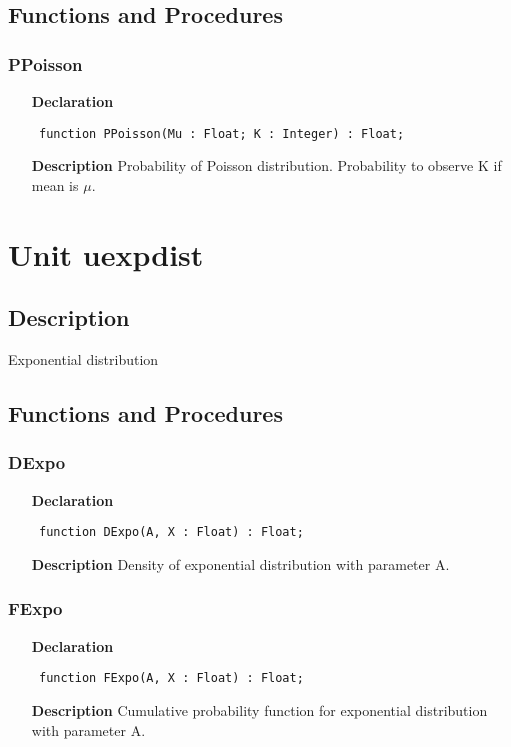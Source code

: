 \documentclass[12pt,a4paper,oneside]{report}
\newcommand{\declarationitem}[1]{\textbf{#1}}
\newcommand{\descriptiontitle}[1]{\textbf{#1}}
\newcommand{\code}[1]{\texttt{#1}}
\begin{document}
\subsection{Functions and Procedures}
\subsubsection{PPoisson}
\label{upoidist-PPoisson}
\begin{itemize}\item[\declarationitem{Declaration}\hfill]
	\begin{flushleft}
		\code{
			function PPoisson(Mu : Float; K : Integer) : Float;}
	\end{flushleft}
	\item[\descriptiontitle{Description}]
	Probability of Poisson distribution. Probability to observe K if mean is $\mu$.
\end{itemize}

\section{Unit uexpdist}
\label{uexpdist}
\subsection{Description}
Exponential distribution 
\subsection{Functions and Procedures}
\subsubsection{DExpo}
\label{uexpdist-DExpo}
\begin{itemize}\item[\declarationitem{Declaration}\hfill]
	\begin{flushleft}
		\code{
			function DExpo(A, X : Float) : Float;}
	\end{flushleft}
	\item[\descriptiontitle{Description}]
	Density of exponential distribution with parameter A.
\end{itemize}
\subsubsection{FExpo}
\label{uexpdist-FExpo}
\begin{itemize}\item[\declarationitem{Declaration}\hfill]
	\begin{flushleft}
		\code{
			function FExpo(A, X : Float) : Float;}
	\end{flushleft}
	\item[\descriptiontitle{Description}]
	Cumulative probability function for exponential distribution with parameter A.
\end{itemize}
\end{document}
